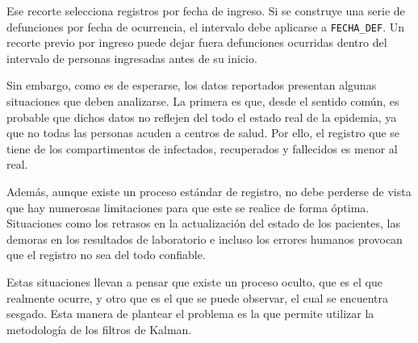 Ese recorte selecciona registros por fecha de ingreso. Si se construye una serie de defunciones por fecha de ocurrencia, el intervalo debe aplicarse a \texttt{FECHA\_DEF}. Un recorte previo por ingreso puede dejar fuera defunciones ocurridas dentro del intervalo de personas ingresadas antes de su inicio.

Sin embargo, como es de esperarse, los datos reportados presentan algunas situaciones que deben analizarse. La primera es que, desde el sentido común, es probable que dichos datos no reflejen del todo el estado real de la epidemia, ya que no todas las personas acuden a centros de salud. Por ello, el registro que se tiene de los compartimentos de infectados, recuperados y fallecidos es menor al real.

Además, aunque existe un proceso estándar de registro, no debe perderse de vista que hay numerosas limitaciones para que este se realice de forma óptima. Situaciones como los retrasos en la actualización del estado de los pacientes, las demoras en los resultados de laboratorio e incluso los errores humanos provocan que el registro no sea del todo confiable.

Estas situaciones llevan a pensar que existe un proceso oculto, que es el que realmente ocurre, y otro que es el que se puede observar, el cual se encuentra sesgado. Esta manera de plantear el problema es la que permite utilizar la metodología de los filtros de Kalman.